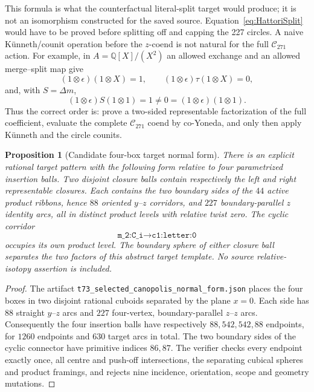 \documentclass[11pt]{amsart}
\newtheorem{proposition}[theorem]{Proposition}
\theoremstyle{definition}
\theoremstyle{remark}
\newcommand{\Q}{\mathbb{Q}}
\begin{document}
This formula is what the counterfactual literal-split target would
produce; it is not an isomorphism constructed for the saved source.
Equation~\eqref{eq:HattoriSplit} would have to be proved before splitting off and
capping the 227 circles.  A naive K\"unneth/counit operation before the
$z$-coend is not natural for the full $\mathcal C_{271}$ action.  For example,
in $A=\Q[X]/(X^2)$ an allowed exchange and an allowed merge--split map give
\[
(1\otimes\epsilon)(1\otimes X)=1,
\qquad(1\otimes\epsilon)\tau(1\otimes X)=0,
\]
and, with $S=\Delta m$,
\[
(1\otimes\epsilon)S(1\otimes1)=1
\ne0=(1\otimes\epsilon)(1\otimes1).
\]
Thus the correct order is: prove a two-sided representable factorization of
the full coefficient, evaluate the complete $\mathcal C_{271}$ coend by
co-Yoneda, and only then apply K\"unneth and the circle counits.

\begin{proposition}[Candidate four-box target normal form]\label{prop:four-box-normal-form}
There is an explicit rational target pattern with the following form relative
to four parametrized insertion balls.  Two
disjoint closure balls contain respectively the left and right representable
closures.  Each contains the two boundary sides of the $44$ active product
ribbons, hence $88$ oriented $y$--$z$ corridors, and $227$
boundary-parallel $z$ identity arcs, all in distinct product levels with
relative twist zero.  The cyclic corridor
\[
\texttt{m\_2:C\_i}\longrightarrow\texttt{c1:letter:0}
\]
occupies its own product level.  The boundary sphere of either closure ball
separates the two factors of this abstract target template.  No source
relative-isotopy assertion is included.
\end{proposition}

\begin{proof}
The artifact
\texttt{t73\_selected\_canopolis\_normal\_form.json} places the four boxes in
two disjoint rational cuboids separated by the plane $x=0$.  Each side has
$88$ straight $y$--$z$ arcs and $227$ four-vertex, boundary-parallel
$z$--$z$ arcs.  Consequently the four insertion balls have respectively
$88,542,542,88$ endpoints, for $1260$ endpoints and $630$ target arcs in
total.  The two boundary sides of the cyclic connector have primitive indices
$86,87$.  The verifier checks every endpoint exactly once, all centre and
push-off intersections, the separating cubical spheres and product framings,
and rejects nine incidence, orientation, scope and geometry mutations.
\end{proof}
\end{document}
